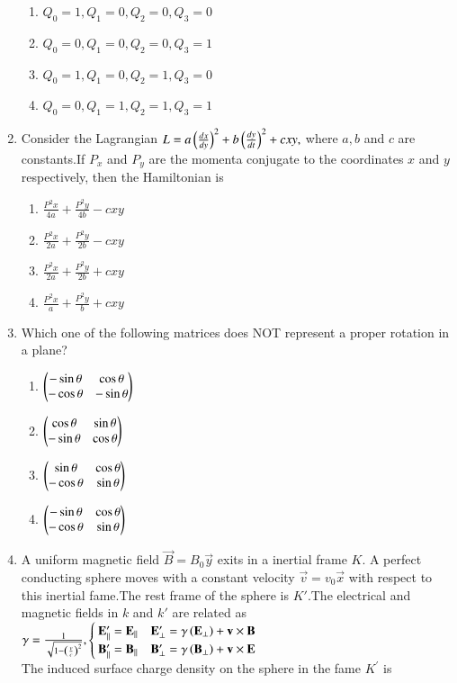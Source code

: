 \documentclass[journal]{IEEEtran}
\begin{document}
\begin{enumerate}
\begin{tikzpicture}
\end{tikzpicture}
    \begin{enumerate}
        \item $Q_{0}=1,Q_{1}=0,Q_{2}=0,Q_{3}=0$
        \item $Q_{0}=0,Q_{1}=0,Q_{2}=0,Q_{3}=1$
        \item $Q_{0}=1,Q_{1}=0,Q_{2}=1,Q_{3}=0$
        \item $Q_{0}=0,Q_{1}=1,Q_{2}=1,Q_{3}=1$
    \end{enumerate}
    \item Consider the Lagrangian $L=a\brak{\frac{dx}{dy}}^2+b\brak{\frac{dy}{dt}}^2+cxy,$ where $a,b$ and $c$ are constants.If $P_x$ and $P_y$ are the momenta conjugate to the coordinates $x$ and $y$ respectively, then the Hamiltonian is
    \begin{enumerate}
        \item $\frac{P^2x}{4a}+\frac{P^2y}{4b}-cxy$
        \item $\frac{P^2x}{2a}+\frac{P^2y}{2b}-cxy$
        \item $\frac{P^2x}{2a}+\frac{P^2y}{2b}+cxy$
        \item $\frac{P^2x}{a}+\frac{P^2y}{b}+cxy$
    \end{enumerate}
    \item Which one of the following matrices does NOT represent a proper rotation in a plane?
    \begin{enumerate}
        \item $\myvec{-\sin\theta&\cos\theta\\-\cos\theta&-\sin\theta}$
        \item $\myvec{\cos\theta&\sin\theta\\-\sin\theta&\cos\theta}$
        \item $\myvec{\sin\theta&\cos\theta\\-\cos\theta&\sin\theta}$
        \item $\myvec{-\sin\theta&\cos\theta\\-\cos\theta&\sin\theta}$  
    \end{enumerate}
    \item A uniform magnetic field $\vec{B}=B_0\vec{y}$ exits in a inertial frame $K$. A perfect conducting sphere moves with a constant velocity $\vec{v}=v_0\vec{x}$ with respect to this inertial
    fame.The rest frame of the sphere is $K\prime$.The electrical and magnetic fields in $k$ and $k\prime$ are related as\\
    $
    \gamma=\frac{1}{\sqrt{1-\brak{\frac{v}{c}}^2}},\begin{cases}
        \vec{E^{\prime}_{\parallel}}=\vec{E_{\parallel}}\quad \vec{E^{\prime}_{\perp}}=\gamma\brak{\vec{E_{\perp}}}+\vec{v}\times\vec{B}\\
    \vec{B^{\prime}_{\parallel}}=\vec{B_{\parallel}}\quad \vec{B^{\prime}_{\perp}}=\gamma\brak{\vec{B_{\perp}}}+\vec{v}\times\vec{E}
    \end{cases}$\\
    The induced surface charge density on the sphere in the fame $K^{\prime}$ is


\end{enumerate}
\end{document}
